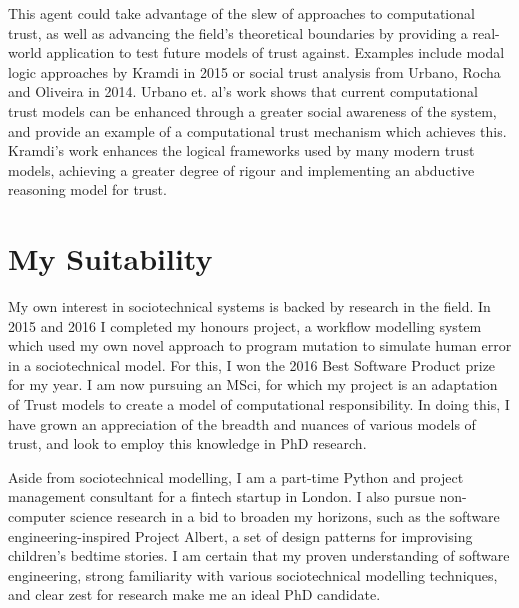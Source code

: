 \documentclass{tufte-handout}
\begin{document}
This agent could take advantage of the slew of approaches to computational trust, as well as advancing the field's theoretical boundaries by providing a real-world application to test future models of trust against. Examples include modal logic approaches by Kramdi in 2015\cite{Kramdi} or social trust analysis from Urbano, Rocha and Oliveira in 2014\cite{Urbano2014}. Urbano et. al's work shows that current computational trust models can be enhanced through a greater social awareness of the system, and provide an example of a computational trust mechanism which achieves this. Kramdi's work enhances the logical frameworks used by many modern trust models, achieving a greater degree of rigour and implementing an abductive reasoning model for trust.\par

\bigskip

\section{My Suitability}
My own interest in sociotechnical systems is backed by research in the field. In 2015 and 2016 I completed my honours project, a workflow modelling system which used my own novel approach to program mutation to simulate human error in a sociotechnical model. For this, I won the 2016 Best Software Product prize for my year. I am now pursuing an MSci, for which my project is an adaptation of Trust models to create a model of computational responsibility. In doing this, I have grown an appreciation of the breadth and nuances of various models of trust, and look to employ this knowledge in PhD research.\par

Aside from sociotechnical modelling, I am a part-time Python and project management consultant for a fintech startup in London. I also pursue non-computer science research in a bid to broaden my horizons, such as the software engineering-inspired Project Albert, a set of design patterns for improvising children's bedtime stories. I am certain that my proven understanding of software engineering, strong familiarity with various sociotechnical modelling techniques, and clear zest for research make me an ideal PhD candidate.


\end{document}
